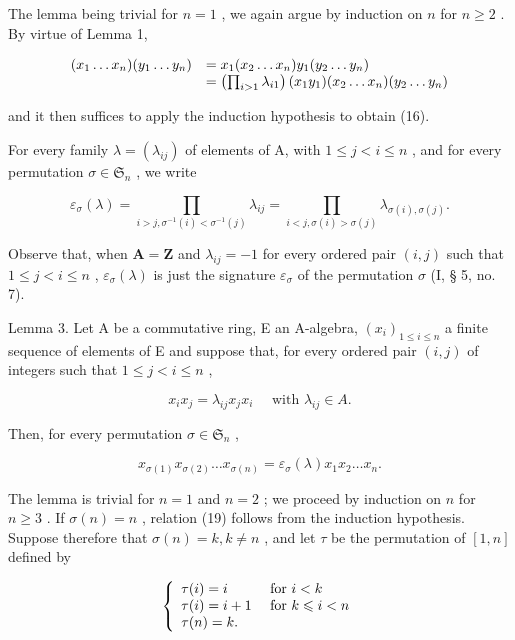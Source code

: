 The lemma being trivial for \(n = 1\) , we again argue by induction on \(n\) for \(n \geqslant 2\) . By virtue of Lemma 1,

\[
\begin{array}{r l} (x _ {1} \dots x _ {n}) (y _ {1} \dots y _ {n}) & = x _ {1} (x _ {2} \dots x _ {n}) y _ {1} (y _ {2} \dots y _ {n}) \\ & = \left(\prod_ {i > 1} \lambda_ {i 1}\right) (x _ {1} y _ {1}) (x _ {2} \dots x _ {n}) (y _ {2} \dots y _ {n}) \end{array}
\]

and it then suffices to apply the induction hypothesis to obtain (16).

For every family \(\lambda = (\lambda_{ij})\) of elements of A, with \(1 \leqslant j < i \leqslant n\) , and for every permutation \(\sigma \in \mathfrak{S}_n\) , we write

\[
\varepsilon_ {\sigma} (\lambda) = \prod_ {i > j, \sigma^ {- 1} (i) < \sigma^ {- 1} (j)} \lambda_ {i j} = \prod_ {i <   j, \sigma (i) > \sigma (j)} \lambda_ {\sigma (i), \sigma (j)}.\tag{17}
\]

Observe that, when \(\mathbf{A} = \mathbf{Z}\) and \(\lambda_{ij} = -1\) for every ordered pair \((i,j)\) such that \(1 \leqslant j < i \leqslant n\) , \(\varepsilon_{\sigma}(\lambda)\) is just the signature \(\varepsilon_{\sigma}\) of the permutation \(\sigma\) (I, § 5, no. 7).

Lemma 3. Let A be a commutative ring, E an A-algebra, \((x_{i})_{1\leqslant i\leqslant n}\) a finite sequence of elements of E and suppose that, for every ordered pair \((i,j)\) of integers such that \(1\leqslant j < i\leqslant n\) ,

\[
x _ {i} x _ {j} = \lambda_ {i j} x _ {j} x _ {i} \quad \text { with } \lambda_ {i j} \in A.\tag{18}
\]

Then, for every permutation \(\sigma \in \mathfrak{S}_n\) ,

\[
x _ {\sigma (1)} x _ {\sigma (2)} \dots x _ {\sigma (n)} = \varepsilon_ {\sigma} (\lambda) x _ {1} x _ {2} \dots x _ {n}.\tag{19}
\]

The lemma is trivial for \(n = 1\) and \(n = 2\) ; we proceed by induction on \(n\) for \(n \geqslant 3\) . If \(\sigma(n) = n\) , relation (19) follows from the induction hypothesis. Suppose therefore that \(\sigma(n) = k, k \neq n\) , and let \(\tau\) be the permutation of \([1, n]\) defined by

\[
\left\{ \begin{array}{l l} \tau (i) = i & \text { for } i <   k \\ \tau (i) = i + 1 & \text { for } k \leqslant i <   n \\ \tau (n) = k. \end{array} \right.
\]

